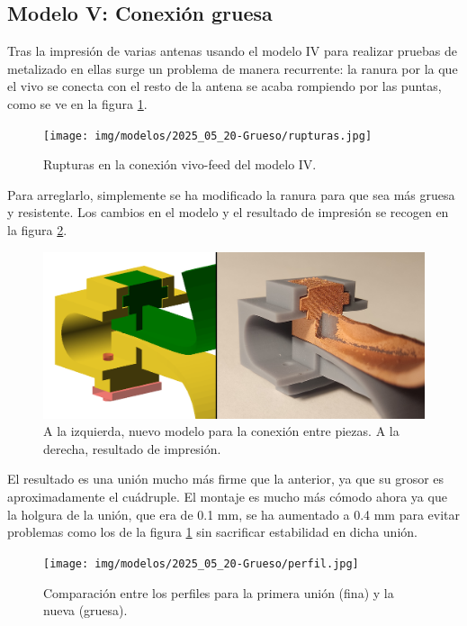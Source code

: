\documentclass[11pt,a4paper,twoside,pdf]{article}
\numberwithin{equation}{section}
\begin{document}
\subsection{Modelo V: Conexión gruesa}

Tras la impresión de varias antenas usando el modelo IV para realizar pruebas de metalizado en ellas surge un problema de manera recurrente: la ranura por la que el vivo se conecta con el resto de la antena se acaba rompiendo por las puntas, como se ve en la figura \ref{fig:rupturas}.
\begin{figure}[!h]
    \centering
    \texttt{[image: img/modelos/2025\_05\_20-Grueso/rupturas.jpg]}
    \caption{Rupturas en la conexión vivo-feed del modelo IV.}
    \label{fig:rupturas}
\end{figure}

Para arreglarlo, simplemente se ha modificado la ranura para que sea más gruesa y resistente. Los cambios en el modelo y el resultado de impresión se recogen en la figura \ref{fig:soporteGrueso}.
\begin{figure}[!h]
    \centering
    \includegraphics[width=0.75\linewidth]{img/modelos/2025_05_20-Grueso/SoporteGruesoRes.png}
    \caption{A la izquierda, nuevo modelo para la conexión entre piezas. A la derecha, resultado de impresión.}
    \label{fig:soporteGrueso}
\end{figure}

El resultado es una unión mucho más firme que la anterior, ya que su grosor es aproximadamente el cuádruple. El montaje es mucho más cómodo ahora ya que la holgura de la unión, que era de 0.1 mm, se ha aumentado a 0.4 mm para evitar problemas como los de la figura \ref{fig:rupturas} sin sacrificar estabilidad en dicha unión. 
\begin{figure}[!h]
    \centering
    \texttt{[image: img/modelos/2025\_05\_20-Grueso/perfil.jpg]}
    \vspace{-0.5cm}
    \caption{Comparación entre los perfiles para la primera unión (fina) y la nueva (gruesa).}
    \label{fig:noParalelo}
\end{figure}
\end{document}
